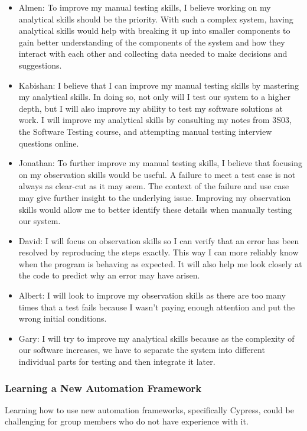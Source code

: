 \documentclass[12pt, titlepage]{article}
\begin{document}
\begin{itemize}
    \item Almen: To improve my manual testing skills, I believe working on my
    analytical skills should be the priority. With such a complex system, having
    analytical skills would help with breaking it up into smaller components to
    gain better understanding of the components of the system and how they
    interact with each other and collecting data needed to make decisions and
    suggestions.
    \item Kabishan: I believe that I can improve my manual testing skills by
    mastering my analytical skills. In doing so, not only will I test our system
    to a higher depth, but I will also improve my ability to test my software
    solutions at work. I will improve my analytical skills by consulting my
    notes from 3S03, the Software Testing course, and attempting manual testing
    interview questions online.
    \item Jonathan: To further improve my manual testing skills, I believe that
    focusing on my observation skills would be useful. A failure to meet a test
    case is not always as clear-cut as it may seem. The context of the failure
    and use case may give further insight to the underlying issue. Improving my
    observation skills would allow me to better identify these details when
    manually testing our system.
    \item David: I will focus on observation skills so I can verify that an
    error has been resolved by reproducing the steps exactly. This way I can
    more reliably know when the program is behaving as expected. It will also
    help me look closely at the code to predict why an error may have arisen.
    \item Albert: I will look to improve my observation skills as there are too
    many times that a test fails because I wasn't paying enough attention and
    put the wrong initial conditions.
    \item Gary: I will try to improve my analytical skills because as the
    complexity of our software increases, we have to separate the system into
    different individual parts for testing and then integrate it later.
\end{itemize}

\subsubsection{Learning a New Automation Framework}
Learning how to use new automation frameworks, specifically Cypress, could be
challenging for group members who do not have experience with it.\\
\end{document}
